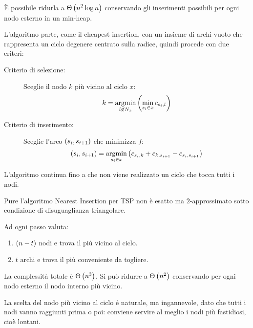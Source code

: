 \documentclass[\main/main.tex]{subfiles}
\begin{document}
\begin{multicols}{2}
\begin{complexity}
    È possibile ridurla a \(\Theta\left(n^2\log n\right)\) conservando gli inserimenti possibili per ogni nodo esterno in un min-heap. 
\end{complexity}
\begin{definition}
    L'algoritmo parte, come il cheapest insertion, con un insieme di archi vuoto che rappresenta un ciclo degenere centrato sulla radice, quindi procede con due criteri:
    \begin{description}
        \item[Criterio di selezione:] Sceglie il nodo \(k\) più vicino al ciclo \(x\):
        \[
            k = \operatorname*{argmin}_{l \not\in N_x} \left(\min_{s_i \in x } c_{s_i, l}\right)
        \]
        \item[Criterio di inserimento:] Sceglie l'arco \(\left(s_i, s_{i+1}\right)\) che minimizza \(f\):
        \[
            \left(s_i, s_{i+1}\right) = \operatorname*{argmin}_{s_i\in x} \left(c_{s_i, k} + c_{k, s_{i+1}} - c_{s_i, s_{i+1}}\right)
        \]
    \end{description}
\end{definition}
\begin{observation}
    L'algoritmo continua fino a che non viene realizzato un ciclo che tocca tutti i nodi.
\end{observation}
\begin{observation}
    Pure l'algoritmo Nearest Insertion per TSP non è esatto ma \(2\)-approssimato sotto condizione di disuguaglianza triangolare.
\end{observation}
\begin{complexity}
    Ad ogni passo valuta:
    \begin{enumerate}
        \item \(\left(n-t\right)\) nodi e trova il più vicino al ciclo.
        \item \(t\) archi e trova il più conveniente da togliere.
    \end{enumerate}
    
    La complessità totale è \(\Theta\left(n^3\right)\). Si può ridurre a \(\Theta\left(n^2\right)\) conservando per ogni nodo esterno il nodo interno più vicino.
\end{complexity}
\begin{definition}
    La scelta del nodo più vicino al ciclo é naturale, ma ingannevole, dato che tutti i nodi vanno raggiunti prima o poi: conviene servire al meglio i nodi più fastidiosi, cioè lontani.


\end{definition}
\end{multicols}
\end{document}
